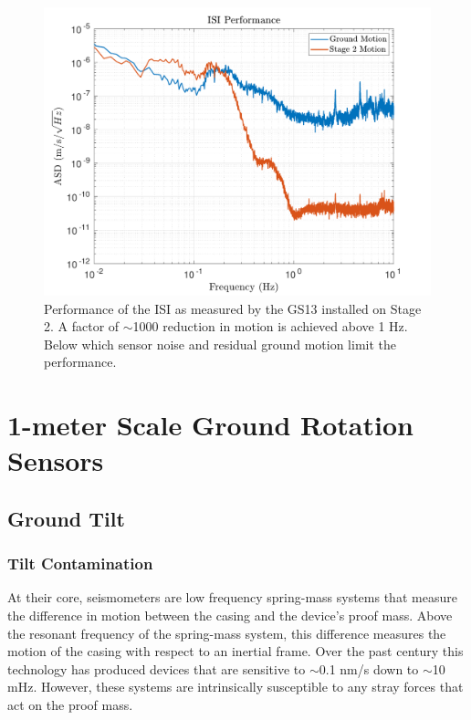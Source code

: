 \documentclass [12pt, proquest]{uwthesis}[2019]
\begin{document}
\begin{figure}[!h]
\begin{center}
\includegraphics[width=\textwidth]{ISIPerf.pdf}
\caption[Performance of the ISI]{Performance of the ISI as measured by the GS13 installed on Stage 2. A factor of $\sim$1000 reduction in motion is achieved above 1 Hz. Below which sensor noise and residual ground motion limit the performance.}
\label{ISIPerf}
\end{center}
\end{figure}

\chapter{1-meter Scale Ground Rotation Sensors} \label{BRS_chap}
\section{Ground Tilt}\label{tilt}
\subsection{Tilt Contamination}\label{tiltCon}
\quad At their core, seismometers are low frequency spring-mass systems that measure the difference in motion between the casing and the device's proof mass. Above the resonant frequency of the spring-mass system, this difference measures the motion of the casing with respect to an inertial frame. Over the past century this technology has produced devices that are sensitive to $\sim$0.1 nm/s down to $\sim$10 mHz. However, these systems are intrinsically susceptible to any stray forces that act on the proof mass.
\end{document}
